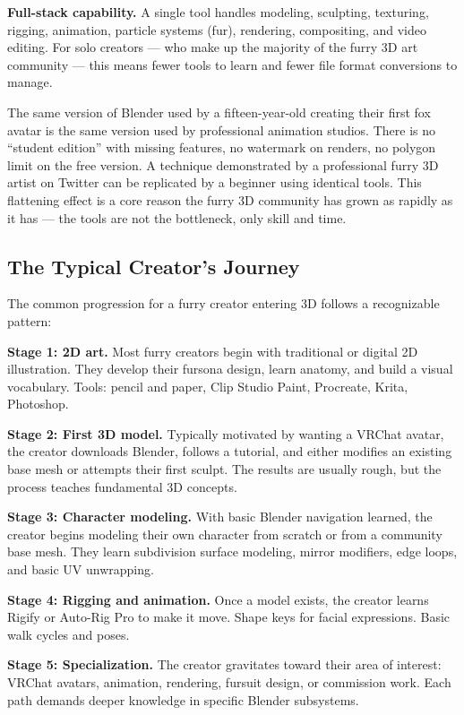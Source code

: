 \textbf{Full-stack capability.} A single tool handles modeling, sculpting, texturing, rigging, animation, particle systems (fur), rendering, compositing, and video editing. For solo creators --- who make up the majority of the furry 3D art community --- this means fewer tools to learn and fewer file format conversions to manage.

\begin{furrybox}
The same version of Blender used by a fifteen-year-old creating their first fox avatar is the same version used by professional animation studios. There is no ``student edition'' with missing features, no watermark on renders, no polygon limit on the free version. A technique demonstrated by a professional furry 3D artist on Twitter can be replicated by a beginner using identical tools. This flattening effect is a core reason the furry 3D community has grown as rapidly as it has --- the tools are not the bottleneck, only skill and time.
\end{furrybox}


\subsection{The Typical Creator's Journey}

The common progression for a furry creator entering 3D follows a recognizable pattern:

\textbf{Stage 1: 2D art.} Most furry creators begin with traditional or digital 2D illustration. They develop their fursona design, learn anatomy, and build a visual vocabulary. Tools: pencil and paper, Clip Studio Paint, Procreate, Krita, Photoshop.

\textbf{Stage 2: First 3D model.} Typically motivated by wanting a VRChat avatar, the creator downloads Blender, follows a tutorial, and either modifies an existing base mesh or attempts their first sculpt. The results are usually rough, but the process teaches fundamental 3D concepts.

\textbf{Stage 3: Character modeling.} With basic Blender navigation learned, the creator begins modeling their own character from scratch or from a community base mesh. They learn subdivision surface modeling, mirror modifiers, edge loops, and basic UV unwrapping.

\textbf{Stage 4: Rigging and animation.} Once a model exists, the creator learns Rigify or Auto-Rig Pro to make it move. Shape keys for facial expressions. Basic walk cycles and poses.

\textbf{Stage 5: Specialization.} The creator gravitates toward their area of interest: VRChat avatars, animation, rendering, fursuit design, or commission work. Each path demands deeper knowledge in specific Blender subsystems.


